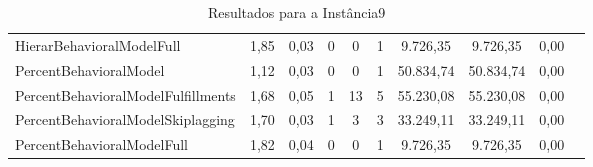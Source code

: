 \begin{table}[H]
{\begin{tabular}{lccccccccc}
            HierarBehavioralModelFull & 1,85 & 0,03 & 0 & 0 & 1 & 9.726,35 & 9.726,35 & 0,00 \\
            PercentBehavioralModel & 1,12 & 0,03 & 0 & 0 & 1 & 50.834,74 & 50.834,74 & 0,00 \\
            PercentBehavioralModelFulfillments & 1,68 & 0,05 & 1 & 13 & 5 & 55.230,08 & 55.230,08 & 0,00 \\
            PercentBehavioralModelSkiplagging & 1,70 & 0,03 & 1 & 3 & 3 & 33.249,11 & 33.249,11 & 0,00 \\
            PercentBehavioralModelFull & 1,82 & 0,04 & 0 & 0 & 1 & 9.726,35 & 9.726,35 & 0,00 \\ \hline
        \end{tabular}%
    }
    \caption{Resultados para a Instância9}
    \label{tab:resultado_instancia9}
\end{table}



